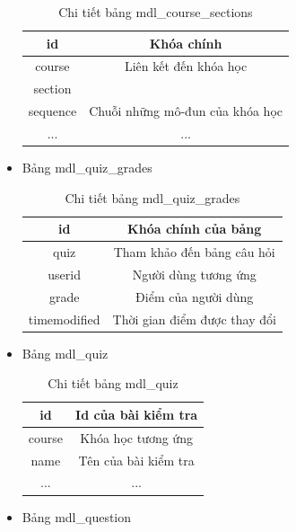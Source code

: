 \begin{itemize}
\begin{center}
\begin{table}[!htp]
			\begin{tabular}{|c|c|}
				\hline 
				id & Khóa chính \\ 
				\hline 
				course & Liên kết đến khóa học \\ 
				\hline 
				section &  \\ 
				\hline 
				sequence & Chuỗi những mô-đun của khóa học \\ 
				\hline 
				... & ... \\ 
				\hline 
			\end{tabular} 
			\caption{Chi tiết bảng mdl\_course\_sections}
			\label{bang9}
		\end{table}
	\end{center}
	\item Bảng mdl\_quiz\_grades
	\begin{center}
		\begin{table}[!htp]
			\centering
			\begin{tabular}{|c|c|}
				\hline 
				id & Khóa chính của bảng \\ 
				\hline 
				quiz & Tham khảo đến bảng câu hỏi \\ 
				\hline 
				userid & Người dùng tương ứng \\ 
				\hline 
				grade & Điểm của người dùng \\ 
				\hline 
				timemodified & Thời gian điểm được thay đổi \\ 
				\hline 
			\end{tabular} 
			\caption{Chi tiết bảng mdl\_quiz\_grades}
			\label{bang10}
		\end{table}
	\end{center}
	\item Bảng mdl\_quiz
	\begin{center}
		\begin{table}[!htp]
			\centering
			\begin{tabular}{|c|c|}
				\hline 
				id & Id của bài kiểm tra \\ 
				\hline 
				course & Khóa học tương ứng \\ 
				\hline 
				name & Tên của bài kiểm tra \\ 
				\hline 
				... & ... \\ 
				\hline 
			\end{tabular} 
			\caption{Chi tiết bảng mdl\_quiz}
			\label{bang11}
		\end{table}
	\end{center}
	\newpage
	\item Bảng mdl\_question
	\begin{center}

\end{center}
\end{itemize}
